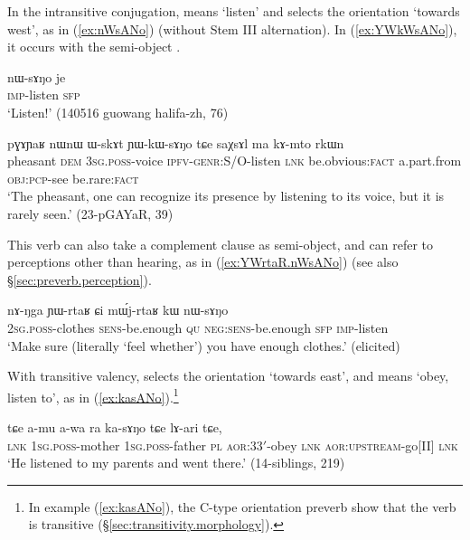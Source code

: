 In the intransitive conjugation,  means `listen' and selects the orientation `towards west', as in (\ref{ex:nWsANo}) (without Stem III alternation). In (\ref{ex:YWkWsANo}), it occurs with the semi-object .

 \begin{exe}
\ex \label{ex:nWsANo}
\gll    nɯ-sɤŋo je  \\
 \textsc{imp}-listen \textsc{sfp} \\
\glt `Listen!' (140516 guowang halifa-zh, 76)
\end{exe}

\begin{exe}
\ex \label{ex:YWkWsANo}
\gll pɣɤɲaʁ nɯnɯ ɯ-skɤt ɲɯ-kɯ-sɤŋo tɕe saχsɤl ma kɤ-mto rkɯn   \\ 
pheasant \textsc{dem} \textsc{3sg}.\textsc{poss}-voice \textsc{ipfv}-\textsc{genr}:\textsc{S/O}-listen \textsc{lnk} be.obvious:\textsc{fact} a.part.from \textsc{obj}:\textsc{pcp}-see be.rare:\textsc{fact} \\
 \glt `The pheasant, one can recognize its presence by listening to its voice, but it is rarely seen.'   (23-pGAYaR, 39)
\end{exe} 

This verb can also take a complement clause as semi-object, and can refer to perceptions other than hearing, as in (\ref{ex:YWrtaR.nWsANo}) (see also §\ref{sec:preverb.perception}).

\begin{exe}
\ex \label{ex:YWrtaR.nWsANo}
\gll nɤ-ŋga ɲɯ-rtaʁ ɕi mɯ́j-rtaʁ kɯ nɯ-sɤŋo \\
\textsc{2sg}.\textsc{poss}-clothes \textsc{sens}-be.enough \textsc{qu} \textsc{neg}:\textsc{sens}-be.enough \textsc{sfp} \textsc{imp}-listen \\
\glt  `Make sure (literally `feel whether') you have enough clothes.' (elicited)
\end{exe} 

With transitive valency,  selects the orientation `towards east', and means `obey, listen to', as in (\ref{ex:kasANo}).\footnote{In example (\ref{ex:kasANo}), the C-type orientation preverb show that the verb is transitive (§\ref{sec:transitivity.morphology}).}

\begin{exe}
\ex \label{ex:kasANo}
\gll  tɕe a-mu a-wa ra ka-sɤŋo tɕe lɤ-ari tɕe, 	 \\
\textsc{lnk} \textsc{1sg}.\textsc{poss}-mother \textsc{1sg}.\textsc{poss}-father \textsc{pl} \textsc{aor}:3\fl{}3$'$-obey \textsc{lnk}  \textsc{aor}:\textsc{upstream}-go[II] \textsc{lnk}\\
 \glt `He listened to my parents and went there.' (14-siblings, 219)
\end{exe}  

